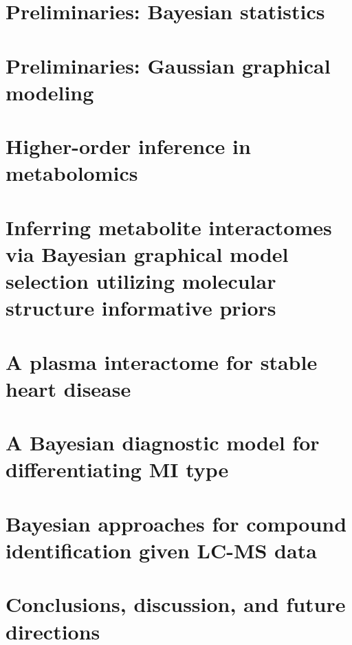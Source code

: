 \documentclass[final]{ulthesis}
\begin{document}
\chapter{Preliminaries: Bayesian statistics}


\chapter{Preliminaries: Gaussian graphical modeling}


\chapter{Higher-order inference in metabolomics}


\chapter{Inferring metabolite interactomes via Bayesian graphical model selection utilizing molecular structure informative priors}


\chapter{A plasma interactome for stable heart disease}


\chapter{A Bayesian diagnostic model for differentiating MI type}


\chapter{Bayesian approaches for compound identification given LC-MS data}


\chapter{Conclusions, discussion, and future directions} 



\backmatter
\begin{DoubleSpace*}


%
%


\end{DoubleSpace*}
\end{document}
